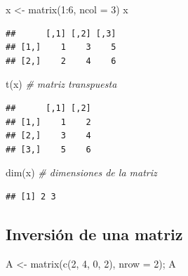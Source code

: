 \documentclass[
]{book}
\newenvironment{Shaded}{\begin{snugshade}}{\end{snugshade}}
\newcommand{\AttributeTok}[1]{\textcolor[rgb]{0.77,0.63,0.00}{#1}}
\newcommand{\CommentTok}[1]{\textcolor[rgb]{0.56,0.35,0.01}{\textit{#1}}}
\newcommand{\DecValTok}[1]{\textcolor[rgb]{0.00,0.00,0.81}{#1}}
\newcommand{\FunctionTok}[1]{\textcolor[rgb]{0.00,0.00,0.00}{#1}}
\newcommand{\NormalTok}[1]{#1}
\newcommand{\OtherTok}[1]{\textcolor[rgb]{0.56,0.35,0.01}{#1}}
\newcommand{\SpecialCharTok}[1]{\textcolor[rgb]{0.00,0.00,0.00}{#1}}
\theoremstyle{break}
\theoremstyle{nonumberplain}
\begin{document}
\begin{Shaded}
\begin{Highlighting}[]
\NormalTok{x }\OtherTok{\textless{}{-}} \FunctionTok{matrix}\NormalTok{(}\DecValTok{1}\SpecialCharTok{:}\DecValTok{6}\NormalTok{, }\AttributeTok{ncol =} \DecValTok{3}\NormalTok{)}
\NormalTok{x}
\end{Highlighting}
\end{Shaded}

\begin{verbatim}
##      [,1] [,2] [,3]
## [1,]    1    3    5
## [2,]    2    4    6
\end{verbatim}

\begin{Shaded}
\begin{Highlighting}[]
\FunctionTok{t}\NormalTok{(x)  }\CommentTok{\# matriz transpuesta}
\end{Highlighting}
\end{Shaded}

\begin{verbatim}
##      [,1] [,2]
## [1,]    1    2
## [2,]    3    4
## [3,]    5    6
\end{verbatim}

\begin{Shaded}
\begin{Highlighting}[]
\FunctionTok{dim}\NormalTok{(x)  }\CommentTok{\# dimensiones de la matriz}
\end{Highlighting}
\end{Shaded}

\begin{verbatim}
## [1] 2 3
\end{verbatim}

\hypertarget{inversiuxf3n-de-una-matriz}{%
\subsection{Inversión de una matriz}\label{inversiuxf3n-de-una-matriz}}

\begin{Shaded}
\begin{Highlighting}[]
\NormalTok{A }\OtherTok{\textless{}{-}} \FunctionTok{matrix}\NormalTok{(}\FunctionTok{c}\NormalTok{(}\DecValTok{2}\NormalTok{, }\DecValTok{4}\NormalTok{, }\DecValTok{0}\NormalTok{, }\DecValTok{2}\NormalTok{), }\AttributeTok{nrow =} \DecValTok{2}\NormalTok{); A}
\end{Highlighting}
\end{Shaded}
\end{document}
